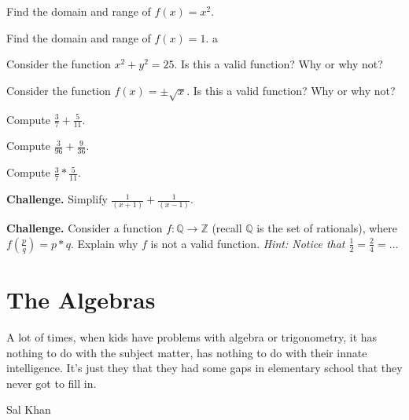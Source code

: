 \documentclass{scrbook}
\theoremstyle{definition}
\newenvironment{exercise}[1]{%
  \renewcommand\theexerciseinner{#1}%
  \exerciseinner
}{\endexerciseinner}
\newcommand{\Q}{\mathbb{Q}}
\newcommand{\Z}{\mathbb{Z}}
\begin{document}
\begin{exercise}{1.5.2}
Find the domain and range of $f(x) = x^2$.
\end{exercise}

\begin{exercise}{1.5.3}
Find the domain and range of $f(x) = 1$.
\end{exercise}a

\begin{exercise}{1.5.4}
Consider the function $x^2 + y^2 = 25$. Is this a valid function? Why or why not?
\end{exercise}

\begin{exercise}{1.5.5}
Consider the function $f(x) = \pm\sqrt{x}$. Is this a valid function? Why or why not? 
\end{exercise}

\begin{exercise}{1.5.6}
Compute $\frac{3}{7} + \frac{5}{11}$.
\end{exercise}

\begin{exercise}{1.5.7}
Compute $\frac{3}{96} + \frac{9}{36}$. 
\end{exercise}

\begin{exercise}{1.5.8}
Compute $\frac{3}{7} * \frac{5}{11}$. 
\end{exercise}

\begin{exercise}{1.5.9}
\textbf{Challenge.}
Simplify $\frac{1}{(x+1)} + \frac{1}{(x-1)}$. 
\end{exercise}

\begin{exercise}{1.5.10}
\textbf{Challenge.}
Consider a function $f : \Q \longrightarrow \Z$ (recall $\Q$ is the set of rationals), where $f(\frac{p}{q}) = p * q$. Explain why $f$ is not a valid function. \textit{Hint: Notice that $\frac{1}{2} = \frac{2}{4} = \dots$}
\end{exercise}

\chapter{The Algebras}
\epigraph{A lot of times, when kids have problems with algebra or trigonometry, it has nothing to do with the subject matter, has nothing to do with their innate intelligence. It's just they that they had some gaps in elementary school that they never got to fill in.}{Sal Khan}





\end{document}
